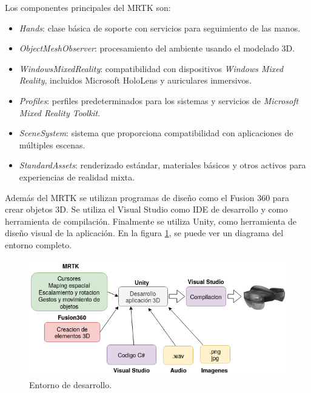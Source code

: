 
Los componentes principales del MRTK son:
\begin{itemize}
\item \textit{Hands}: clase básica de soporte con servicios para seguimiento de las manos.
\item \textit{ObjectMeshObserver}: procesamiento del ambiente usando el modelado 3D.
\item \textit{WindowsMixedReality}: compatibilidad con dispositivos \textit{Windows Mixed Reality}, incluidos Microsoft HoloLens y auriculares inmersivos.
\item \textit{Profiles}: perfiles predeterminados para los sistemas y servicios de \textit{Microsoft Mixed Reality Toolkit}.
\item \textit{SceneSystem}: sistema que proporciona compatibilidad con aplicaciones de múltiples escenas.
\item \textit{StandardAssets}: renderizado estándar, materiales básicos y otros activos para experiencias de realidad mixta.
\end{itemize}

Además del MRTK se utilizan programas de diseño como el Fusion 360 \citep{Fusion} para crear objetos 3D. Se utiliza el Visual Studio \citep{VS}  como IDE de desarrollo y como herramienta de compilación. Finalmente se utiliza Unity, como herramienta de diseño visual de la aplicación. En la figura \ref{fig:workflow}, se puede ver un diagrama del entorno completo.

\begin{figure}[htpb]
	\centering
	\includegraphics[scale=0.55]{./Figures/workflow.png}
	\caption{Entorno de desarrollo\protect\footnotemark.}
	\label{fig:workflow}
\end{figure}

\vspace{10px}

